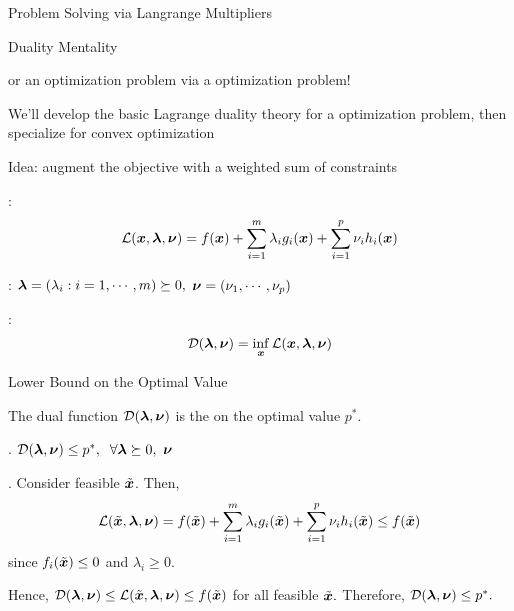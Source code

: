 \documentclass[handout,fleqn,aspectratio=169]{beamer}
\begin{document}
\begin{frame}{Problem Solving via Langrange Multipliers}

\plitemsep 0.1in

\bci 

\item Duality Mentality

\bci
\item {} or  an optimization problem via a  optimization problem!

\item We'll develop the basic Lagrange duality theory for a  optimization problem, then specialize for convex
optimization
\eci

\item Idea: augment the objective with a weighted sum of constraints

\bci

\item {}: $${\cal L}(\bm{x},\bm{\lambda},\bm{\nu})=f(\bm{x}) +
\sum_{i=1}^{m}\lambda_{i}g_{i}(\bm{x}) + \sum_{i=1}^{p}\nu_{i}h_{i}(\bm{x})$$

\item {}: $\bm{\lambda} = (\lambda_i: i = 1, \cdots, m)\succeq
0,$ $\bm{\nu}=(\nu_1, \cdots, \nu_p)$

\item {}: $${\cal D}(\bm{\lambda},\bm{\nu})=\inf_{\bm{x}}
{\cal L}(\bm{x},\bm{\lambda},\bm{\nu})$$
\eci

\eci
\end{frame}



\begin{frame}{Lower Bound on the Optimal Value}

\plitemsep 0.1in

\bci 

\item The dual function ${\cal D}(\bm{\lambda},\bm{\nu})$ is the  on the optimal value $p^*.$

\item {}. ${\cal D}(\bm{\lambda},\bm{\nu})\leq p^{*}, \;\; \forall \bm{\lambda}\succeq
0,\ \bm{\nu}$


\item {}. Consider feasible $\tilde{\bm{x}}$. Then, 
\[
{\cal L}(\tilde{\bm{x}},\bm{\lambda},\bm{\nu}) = f(\tilde{\bm{x}}) +
\sum_{i=1}^{m}\lambda_{i}g_{i}(\tilde{\bm{x}}) +
\sum_{i=1}^{p}\nu_{i}h_{i}(\tilde{\bm{x}}) \leq f(\tilde{\bm{x}})
\]
since $f_{i}(\tilde{\bm{x}})\leq 0$ and $\lambda_{i}\geq 0.$

Hence, ${\cal D}(\bm{\lambda},\bm{\nu})\leq {\cal L}(\tilde{\bm{x}},\bm{\lambda},\bm{\nu}) \leq
f(\tilde{\bm{x}})$ for all feasible $\tilde{\bm{x}}.$
Therefore, ${\cal D}(\bm{\lambda},\bm{\nu})\leq p^{*}.$

\eci
\end{frame}
\end{document}
